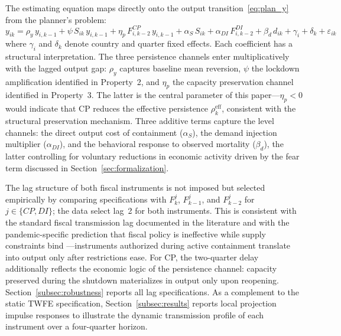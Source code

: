 \documentclass[12pt, a4paper]{article}
\begin{document}
The estimating equation maps directly onto the output transition~\eqref{eq:plan_y} from the planner's problem:
%
\begin{equation}
    y_{ik} = \rho_y\, y_{i,k-1}
    + \psi\, S_{ik}\, y_{i,k-1}
    + \eta_p\, F^{CP}_{i,k-2}\, y_{i,k-1}
    + \alpha_S\, S_{ik}
    + \alpha_{DI}\, F^{DI}_{i,k-2}
    + \beta_d\, d_{ik}
    + \gamma_i + \delta_k + \varepsilon_{ik}
    \label{eq:output_est}
\end{equation}
%
where $\gamma_i$ and $\delta_k$ denote country and quarter fixed effects. Each coefficient has a structural interpretation. The three persistence channels enter multiplicatively with the lagged output gap: $\rho_y$ captures baseline mean reversion, $\psi$ the lockdown amplification identified in Property~2, and $\eta_p$ the capacity preservation channel identified in Property~3. The latter is the central parameter of this paper---$\eta_p < 0$ would indicate that CP reduces the effective persistence $\rho^{\text{eff}}_k$, consistent with the structural preservation mechanism. Three additive terms capture the level channels: the direct output cost of containment ($\alpha_S$), the demand injection multiplier ($\alpha_{DI}$), and the behavioral response to observed mortality ($\beta_d$), the latter controlling for voluntary reductions in economic activity driven by the fear term discussed in Section~\ref{sec:formalization}.

The lag structure of both fiscal instruments is not imposed but selected empirically by comparing specifications with $F^{j}_{k}$, $F^{j}_{k-1}$, and $F^{j}_{k-2}$ for $j \in \{CP, DI\}$; the data select lag~2 for both instruments. This is consistent with the standard fiscal transmission lag documented in the literature \citep{blanchard2002, ramey2018} and with the pandemic-specific prediction that fiscal policy is ineffective while supply constraints bind \citep{guerrieri2022}---instruments authorized during active containment translate into output only after restrictions ease. For CP, the two-quarter delay additionally reflects the economic logic of the persistence channel: capacity preserved during the shutdown materializes in output only upon reopening. Section~\ref{subsec:robustness} reports all lag specifications. As a complement to the static TWFE specification, Section~\ref{subsec:results} reports local projection impulse responses \citep{JordaTaylor2025} to illustrate the dynamic transmission profile of each instrument over a four-quarter horizon.
\end{document}

